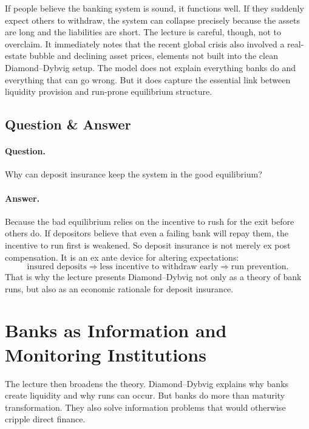 If people believe the banking system is sound, it functions well. If they suddenly expect others to withdraw, the system can collapse precisely because the assets are long and the liabilities are short. The lecture is careful, though, not to overclaim. It immediately notes that the recent global crisis also involved a real-estate bubble and declining asset prices, elements not built into the clean Diamond--Dybvig setup. The model does not explain everything banks do and everything that can go wrong. But it does capture the essential link between liquidity provision and run-prone equilibrium structure.

\subsection{Question \& Answer}

\paragraph{Question.} Why can deposit insurance keep the system in the good equilibrium?

\paragraph{Answer.} Because the bad equilibrium relies on the incentive to rush for the exit before others do. If depositors believe that even a failing bank will repay them, the incentive to run first is weakened. So deposit insurance is not merely ex post compensation. It is an ex ante device for altering expectations:
\begin{equation}
\text{insured deposits}
\Rightarrow
\text{less incentive to withdraw early}
\Rightarrow
\text{run prevention}.
\end{equation}
That is why the lecture presents Diamond--Dybvig not only as a theory of bank runs, but also as an economic rationale for deposit insurance.

\section{Banks as Information and Monitoring Institutions}

The lecture then broadens the theory. Diamond--Dybvig explains why banks create liquidity and why runs can occur. But banks do more than maturity transformation. They also solve information problems that would otherwise cripple direct finance.

